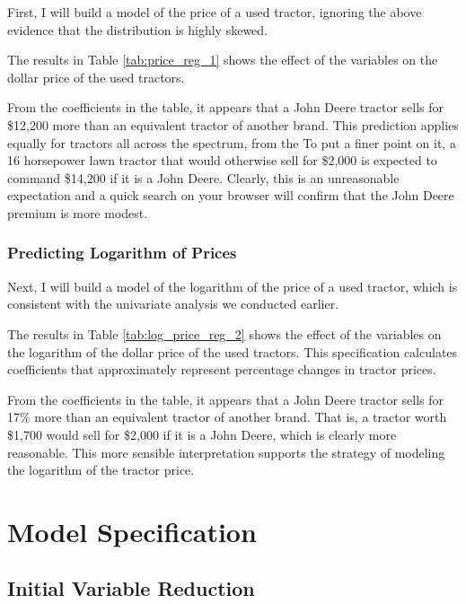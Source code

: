First, I will build a model of the price of a used tractor, 
ignoring the above evidence that the distribution is highly skewed. 



The results in Table \ref{tab:price_reg_1}
shows the effect of the variables on the dollar price of the
used tractors. 

From the coefficients in the table, 
it appears that a John Deere tractor sells for 
\$12,200 more than an equivalent tractor of another brand. 
This prediction applies equally for tractors all across the spectrum, from the 
To put a finer point on it, 
a 16 horsepower lawn tractor that would otherwise sell for \$2,000 is expected to command \$14,200 if it is a John Deere.
Clearly, this is an unreasonable expectation and
a quick search on your browser will confirm that the John Deere premium is more modest. 


\pagebreak
\subsubsection{Predicting Logarithm of Prices}

Next, I will build a model of the logarithm of the price 
of a used tractor, 
which is consistent with the univariate analysis we conducted earlier. 



The results in Table \ref{tab:log_price_reg_2}
shows the effect of the variables on the logarithm of the dollar price of the used tractors. 
This specification calculates coefficients that 
approximately represent percentage changes in 
tractor prices. 

From the coefficients in the table, 
it appears that a John Deere tractor sells for 
17\% more than an equivalent tractor of another brand. 
That is, a tractor worth \$1,700 would sell
for \$2,000 if it is a John Deere, 
which is clearly more reasonable. 
This more sensible interpretation supports 
the strategy of modeling the 
logarithm of the tractor price. 


\clearpage
\section{Model Specification}

\subsection{Initial Variable Reduction}


